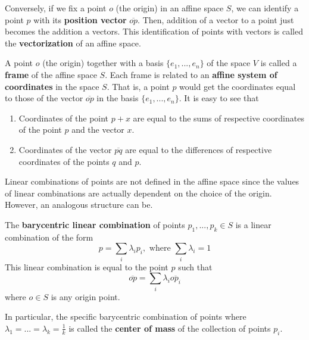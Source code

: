 \documentclass{article}
\begin{document}
    \begin{definition}
      Conversely, if we fix a point $o$ (the origin) in an affine space $S$, we can identify a point $p$ with its \textbf{position vector} $\overline{op}$. Then, addition of a vector to a point just becomes the addition a vectors. This identification of points with vectors is called the \textbf{vectorization} of an affine space. 
    \end{definition}

    \begin{definition}
      A point $o$ (the origin) together with a basis $\{e_1, ..., e_n\}$ of the space $V$ is called a \textbf{frame} of the affine space $S$. Each frame is related to an \textbf{affine system of coordinates} in the space $S$. That is, a point $p$ would get the coordinates equal to those of the vector $\overline{op}$ in the basis $\{e_1, ..., e_n\}$. It is easy to see that 
      \begin{enumerate}
        \item Coordinates of the point $p+x$ are equal to the sums of respective coordinates of the point $p$ and the vector $x$. 
        \item Coordinates of the vector $\overline{pq}$ are equal to the differences of respective coordinates of the points $q$ and $p$. 
      \end{enumerate}
    \end{definition}

    Linear combinations of points are not defined in the affine space since the values of linear combinations are actually dependent on the choice of the origin. However, an analogous structure can be. 

    \begin{definition}
      The \textbf{barycentric linear combination} of points $p_1, ..., p_k \in S$ is a linear combination of the form
      \begin{equation}
        p = \sum_i \lambda_i p_i, \text{ where } \sum_i \lambda_i = 1
      \end{equation}
      This linear combination is equal to the point $p$ such that
      \begin{equation}
        \overline{op} = \sum_i \lambda_i \overline{op_i}
      \end{equation}
      where $o \in S$ is any origin point.
    \end{definition}

    \begin{definition}
      In particular, the specific barycentric combination of points where $\lambda_1 = ... = \lambda_k = \frac{1}{k}$ is called the \textbf{center of mass} of the collection of points $p_i$. 
    \end{definition}
\end{document}
